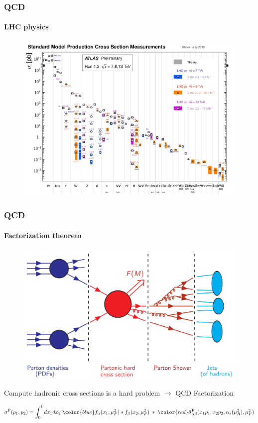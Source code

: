 \documentclass[aspectratio=43]{beamer}
\begin{document}
\begin{frame}

	\frametitle{QCD}
	\framesubtitle{LHC physics}
	
	\begin{figure}
		\includegraphics[width = 9.5 cm]{plots/lhc_measurements.png}
	\end{figure}

\end{frame}

\begin{frame}

	\frametitle{QCD}
	\framesubtitle{Factorization theorem}

	\vspace{0.4 cm}
	
	\begin{figure}
		\includegraphics[width = 7 cm]{plots/factorization_1.png}
	\end{figure}
	
	Compute hadronic cross sections is a {\color{red}hard problem} $\longrightarrow$ {\color{blue} QCD Factorization}
	
	\begin{equation}
		\sigma^{\textrm{F}}(p_{1}, p_{2}) =
		\int_{0}^{1} dx_{1} dx_{2} \; {\color{blue} f_{\alpha}(x_{1}, \mu_{F}^{2}) \ast f_{\beta}(x_{2}, \mu_{F}^{2})}
		\; \ast \;  
		{\color{red}\hat{\sigma}^{\textrm{F}}_{\alpha \beta}(x_{1}p_{1}, x_{2}p_{2}, \alpha_{s}(\mu_{R}^{2}), \mu_{F}^{2})} \nonumber
	\end{equation}

\end{frame}
\end{document}
